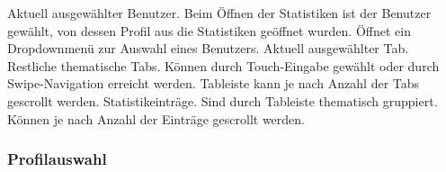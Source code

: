 \begin{center}
\setlength\fboxsep{20pt}
\setlength\fboxrule{1pt}
\end{center}

\begin{requirements}
 Aktuell ausgewählter Benutzer. Beim Öffnen der Statistiken ist der Benutzer gewählt, von dessen Profil aus die Statistiken geöffnet wurden. Öffnet ein Dropdownmenü zur Auswahl eines Benutzers.
 Aktuell ausgewählter Tab.
 Restliche thematische Tabs. Können durch Touch-Eingabe gewählt oder durch Swipe-Navigation erreicht werden. Tableiste kann je nach Anzahl der Tabs gescrollt werden.
 Statistikeinträge. Sind durch Tableiste thematisch gruppiert. Können je nach Anzahl der Einträge gescrollt werden.
\end{requirements}

\subsubsection{Profilauswahl}

\begin{center}
\setlength\fboxsep{20pt}
\setlength\fboxrule{1pt}
\end{center}

